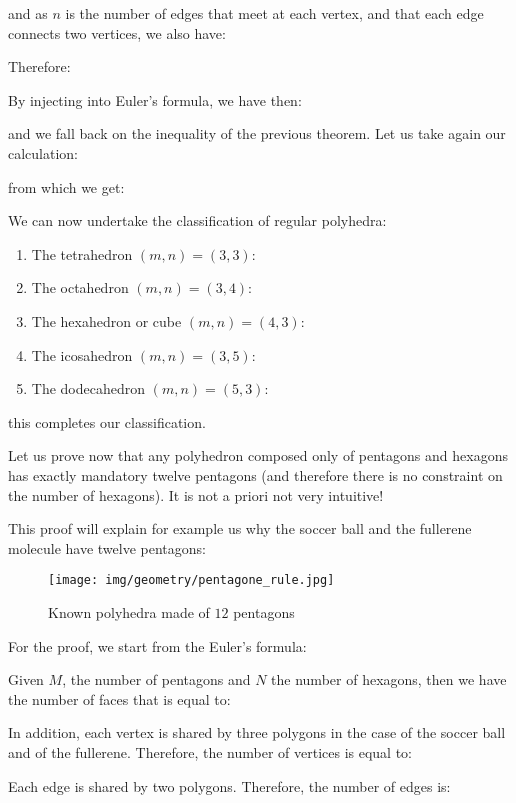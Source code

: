 {	and as $n$ is the number of edges that meet at each vertex, and that each edge connects two vertices, we also have:
	
	Therefore:
	
	By injecting into Euler's formula, we have then:
	
	and we fall back on the inequality of the previous theorem. Let us take again our calculation:
	
	from which we get:
	
	We can now undertake the classification of regular polyhedra:
	\begin{enumerate}
		\item The tetrahedron $(m,n)=(3,3)$:
		
		
		\item The octahedron $(m,n)=(3,4)$:
		
		
		\item The hexahedron or cube $(m,n)=(4,3)$:
		
		
		\item The icosahedron $(m,n)=(3,5)$:
		
		
		\item The dodecahedron $(m,n)=(5,3)$:
		
	\end{enumerate}
	this completes our classification.
	
	Let us prove now that any polyhedron composed only of pentagons and hexagons has exactly mandatory  twelve pentagons (and therefore there is no constraint on the number of hexagons). It is not a priori not very intuitive!
	
	This proof will explain for example us why the soccer ball and the fullerene molecule have twelve pentagons:
	\begin{figure}[H]
		\centering
		\texttt{[image: img/geometry/pentagone\_rule.jpg]}
		\caption{Known polyhedra made of $12$ pentagons}
	\end{figure}
	\begin{dem}
	For the proof, we start from the Euler's formula:
	
	Given $M$, the number of pentagons and $N$ the number of hexagons, then we have the number of faces that is equal to:
	
	In addition, each vertex is shared by three polygons in the case of the soccer ball and of the fullerene. Therefore, the number of vertices is equal to:
	
	Each edge is shared by two polygons. Therefore, the number of edges is:
	

\end{dem}}
